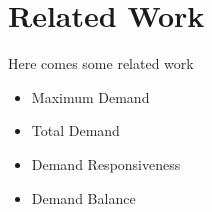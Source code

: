 ﻿\documentclass[../main/Self-Stabilization.tex]{subfiles}
\begin{document}
\section{Related Work}\label{related}
Here comes some related work


\begin{itemize}
  \item Maximum Demand
  \item Total Demand
  \item Demand Responsiveness
  \item Demand Balance
\end{itemize}
\end{document}

